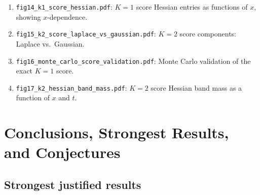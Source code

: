 \documentclass[11pt,a4paper]{article}
\theoremstyle{plain}
\theoremstyle{definition}
\begin{document}
\begin{enumerate}
\item[\textbf{F14.}] \texttt{fig14\_k1\_score\_hessian.pdf}: $K\!=\!1$ score Hessian entries as functions of $x$, showing $x$-dependence.
\item[\textbf{F15.}] \texttt{fig15\_k2\_score\_laplace\_vs\_gaussian.pdf}: $K\!=\!2$ score components: Laplace vs.\ Gaussian.
\item[\textbf{F16.}] \texttt{fig16\_monte\_carlo\_score\_validation.pdf}: Monte Carlo validation of the exact $K\!=\!1$ score.
\item[\textbf{F17.}] \texttt{fig17\_k2\_hessian\_band\_mass.pdf}: $K\!=\!2$ score Hessian band mass as a function of $x$ and $t$.
\end{enumerate}

\section{Conclusions, Strongest Results, and Conjectures}
\label{sec:conclusions}

\subsection{Strongest justified results}
\label{sec:justified-results}
\end{document}
